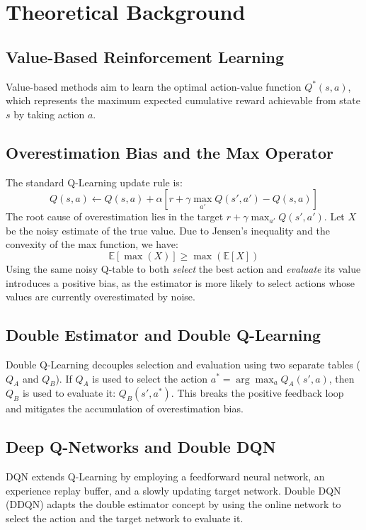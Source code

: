 \documentclass[11pt,a4paper]{article}
\begin{document}
\section{Theoretical Background}
\subsection{Value-Based Reinforcement Learning}
Value-based methods aim to learn the optimal action-value function $Q^*(s,a)$, which represents the maximum expected cumulative reward achievable from state $s$ by taking action $a$.

\subsection{Overestimation Bias and the Max Operator}
The standard Q-Learning update rule is:
\begin{equation}
    Q(s,a) \leftarrow Q(s,a) + \alpha \left[ r + \gamma \max_{a'} Q(s',a') - Q(s,a) \right]
\end{equation}
The root cause of overestimation lies in the target $r + \gamma \max_{a'} Q(s',a')$. Let $X$ be the noisy estimate of the true value. Due to Jensen's inequality and the convexity of the max function, we have:
\begin{equation}
    \mathbb{E}[\max(X)] \ge \max(\mathbb{E}[X])
\end{equation}
Using the same noisy Q-table to both \textit{select} the best action and \textit{evaluate} its value introduces a positive bias, as the estimator is more likely to select actions whose values are currently overestimated by noise.

\subsection{Double Estimator and Double Q-Learning}
Double Q-Learning decouples selection and evaluation using two separate tables ($Q_A$ and $Q_B$). If $Q_A$ is used to select the action $a^* = \arg\max_a Q_A(s', a)$, then $Q_B$ is used to evaluate it: $Q_B(s', a^*)$. This breaks the positive feedback loop and mitigates the accumulation of overestimation bias.

\subsection{Deep Q-Networks and Double DQN}
DQN extends Q-Learning by employing a feedforward neural network, an experience replay buffer, and a slowly updating target network. Double DQN (DDQN) adapts the double estimator concept by using the online network to select the action and the target network to evaluate it.
\end{document}
